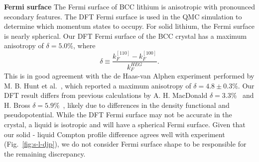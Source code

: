 \documentclass[aps,prb,showpacs,preprintnumbers,amsmath,amssymb,superscriptaddress,twocolumn]{revtex4-1}
\newcommand{\david}[1]{ \textcolor{red}{\textbf{DC: #1}}}
\newcommand{\mh}[1]{ \textcolor{blue}{\textbf{#1}}}
\begin{document}



{\bf Fermi surface}  The Fermi surface of BCC lithium is anisotropic with pronounced secondary features. %
The DFT Fermi surface is used in the QMC simulation to determine which momentum states to occupy.
For solid lithium, the Fermi surface is nearly spherical. Our DFT Fermi surface of the BCC crystal has a maximum anisotropy of $\delta=5.0\%$, where
\begin{equation} \label{eq:ani-delta}
\delta \equiv \dfrac{k_F^{[110]} - k_F^{[100]}}{k_F^{HEG}}.
\end{equation}
This is in good agreement with the de Haas-van Alphen experiment performed by M. B. Hunt et al.~\cite{Hunt1989}, which reported a maximum anisotropy of $\delta=4.8\pm 0.3\%$. Our DFT result differs from previous calculations by A. H. MacDonald $\delta=3.3\%$~\cite{MacDonald1980} and H. Bross $\delta=5.9\%$~\cite{Bross2005}, likely due to differences in the density functional and pseudopotential.
While the DFT Fermi surface may not be accurate in the crystal,  a liquid is isotropic and will have a spherical Fermi surface.
Given that our solid - liquid Compton profile difference agrees well with experiment (Fig.~\ref{fig:s-l-djp}), we do not consider Fermi surface shape to be responsible for the remaining discrepancy.
\end{document}
